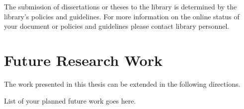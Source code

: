 The submission of dissertations or theses to the library is determined by the library's policies and guidelines. For more information on the online status of your document or policies and guidelines please contact library personnel.

\section{Future Research Work}

The work presented in this thesis can be extended in the following directions.

List of your planned future work goes here.

